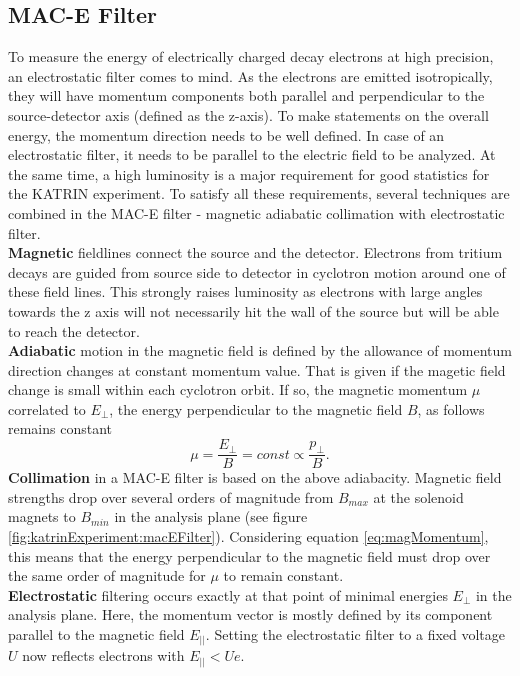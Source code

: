        \subsection{MAC-E Filter}
      \label{ch:The KATRIN experiment:sec:MAC-E}
		To measure the energy of electrically charged decay electrons at high precision, an electrostatic filter comes to mind. As the electrons are emitted isotropically, they will have momentum components both parallel and perpendicular to the source-detector axis (defined as the z-axis). To make statements on the overall energy, the momentum direction needs to be well defined. In case of an electrostatic filter, it needs to be parallel to the electric field to be analyzed.
		At the same time, a high luminosity is a major requirement for good statistics for the KATRIN experiment.
		To satisfy all these requirements, several techniques are combined in the MAC-E filter - magnetic adiabatic collimation with electrostatic filter.\\
		{\bf Magnetic} fieldlines connect the source and the detector. Electrons from tritium decays are guided from source side to detector in cyclotron motion around one of these field lines. This strongly raises luminosity as electrons with large angles towards the z axis will not necessarily hit the wall of the source but will be able to reach the detector.\\
		{\bf Adiabatic} motion in the magnetic field is defined by the allowance of momentum direction changes at constant momentum value. That is given if the magetic field change is small within each cyclotron orbit. If so, the magnetic momentum $\mu$ correlated to $E_\bot$, the energy perpendicular to the magnetic field $B$, as follows remains constant
		\begin{equation}
			\mu = \frac{E_{\bot}}{B} = const \propto \frac{p_\bot}{B}.
			\label{eq:magMomentum}
		\end{equation}
		{\bf Collimation} in a MAC-E filter is based on the above adiabacity. Magnetic field strengths drop over several orders of magnitude from $B_{max}$ at the solenoid magnets to $B_{min}$ in the analysis plane (see figure \ref{fig:katrinExperiment:macEFilter}). Considering equation \ref{eq:magMomentum}, this means that the energy perpendicular to the magnetic field must drop over the same order of magnitude for $\mu$ to remain constant.\\
		{\bf Electrostatic} filtering occurs exactly at that point of minimal energies $E_\bot$ in the analysis plane. Here, the momentum vector is mostly defined by its component parallel to the magnetic field $E_{||}$. Setting the electrostatic filter to a fixed voltage $U$ now reflects electrons with $E_{||} < Ue$.\\
